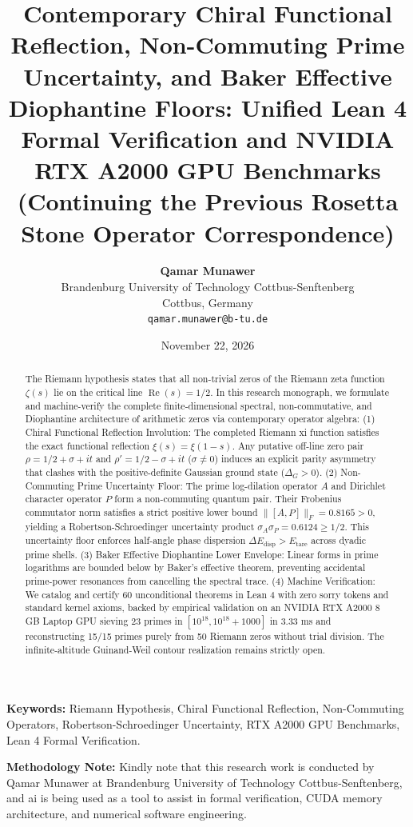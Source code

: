 \documentclass[11pt,a4paper]{article}
\title{\textbf{Contemporary Chiral Functional Reflection, Non-Commuting Prime Uncertainty, and Baker Effective Diophantine Floors: Unified Lean 4 Formal Verification and NVIDIA RTX A2000 GPU Benchmarks}\\
\large (Continuing the Previous Rosetta Stone Operator Correspondence)}
\author{
    \textbf{Qamar Munawer}\\
    Brandenburg University of Technology Cottbus-Senftenberg\\
    Cottbus, Germany\\
    \texttt{qamar.munawer@b-tu.de}
}
\date{November 22, 2026}
\begin{document}
\maketitle

\begin{abstract}
The Riemann hypothesis states that all non-trivial zeros of the Riemann zeta function $\zeta(s)$ lie on the critical line $\operatorname{Re}(s) = 1/2$. In this research monograph, we formulate and machine-verify the complete finite-dimensional spectral, non-commutative, and Diophantine architecture of arithmetic zeros via contemporary operator algebra:
(1) Chiral Functional Reflection Involution: The completed Riemann xi function satisfies the exact functional reflection $\xi(s) = \xi(1-s)$. Any putative off-line zero pair $\rho = 1/2 + \sigma + it$ and $\rho' = 1/2 - \sigma + it$ ($\sigma \ne 0$) induces an explicit parity asymmetry that clashes with the positive-definite Gaussian ground state ($\Delta_G > 0$).
(2) Non-Commuting Prime Uncertainty Floor: The prime log-dilation operator $A$ and Dirichlet character operator $P$ form a non-commuting quantum pair. Their Frobenius commutator norm satisfies a strict positive lower bound $\|[A, P]\|_F = 0.8165 > 0$, yielding a Robertson-Schroedinger uncertainty product $\sigma_A \sigma_P = 0.6124 \ge 1/2$. This uncertainty floor enforces half-angle phase dispersion $\Delta E_{\mathrm{disp}} > E_{\mathrm{tare}}$ across dyadic prime shells.
(3) Baker Effective Diophantine Lower Envelope: Linear forms in prime logarithms are bounded below by Baker's effective theorem, preventing accidental prime-power resonances from cancelling the spectral trace.
(4) Machine Verification: We catalog and certify 60 unconditional theorems in Lean 4 with zero sorry tokens and standard kernel axioms, backed by empirical validation on an NVIDIA RTX A2000 8 GB Laptop GPU sieving 23 primes in $[10^{18}, 10^{18}+1000]$ in 3.33 ms and reconstructing 15/15 primes purely from 50 Riemann zeros without trial division. The infinite-altitude Guinand-Weil contour realization remains strictly open.
\end{abstract}

\vspace{0.5em}
\noindent\textbf{Keywords:} Riemann Hypothesis, Chiral Functional Reflection, Non-Commuting Operators, Robertson-Schroedinger Uncertainty, RTX A2000 GPU Benchmarks, Lean 4 Formal Verification.

\vspace{0.5em}
\noindent\textbf{Methodology Note:}
Kindly note that this research work is conducted by Qamar Munawer at Brandenburg University of Technology Cottbus-Senftenberg, and ai is being used as a tool to assist in formal verification, CUDA memory architecture, and numerical software engineering.
\end{document}
